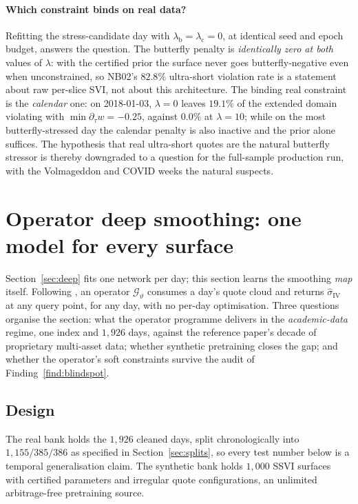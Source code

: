 \paragraph{Which constraint binds on real data?} Refitting the stress-candidate day with
$\lambda_{\mathrm b}=\lambda_{\mathrm c}=0$, at identical seed and epoch budget, answers the
question. The butterfly penalty is \emph{identically zero at both} values of $\lambda$: with the
certified prior the surface never goes butterfly-negative even when unconstrained, so NB02's
$82.8\%$ ultra-short violation rate is a statement about raw per-slice SVI, not about this
architecture. The binding
real constraint is the \emph{calendar} one: on 2018-01-03, $\lambda=0$ leaves $19.1\%$ of the
extended domain violating with $\min\partial_\tau w=-0.25$, against $0.0\%$ at $\lambda=10$;
while on the most butterfly-stressed day the calendar penalty is also inactive and the prior
alone suffices. The hypothesis that real ultra-short quotes are the natural butterfly stressor
is thereby downgraded to a question for the full-sample production run, with the Volmageddon and COVID
weeks the natural suspects.

\section{Operator deep smoothing: one model for every surface}\label{sec:operator}

Section~\ref{sec:deep} fits one network per day; this section learns the smoothing \emph{map}
itself. Following \cite{wiedemann2025}, an operator $\mathcal G_\vartheta$ consumes a day's
quote cloud and returns $\widehat\sigma_{\mathrm{IV}}$ at any query point, for any day, with no
per-day optimisation. Three questions organise the section: what the operator programme delivers
in the \emph{academic-data} regime, one index and $1{,}926$ days, against the reference paper's
decade of proprietary multi-asset data; whether synthetic pretraining closes the gap; and
whether the operator's soft constraints survive the audit of Finding~\ref{find:blindspot}.

\subsection{Design}

The real bank holds the $1{,}926$ cleaned days, split chronologically into $1{,}155/385/386$ as specified in Section~\ref{sec:splits}, so every test number below is a temporal generalisation claim. The
synthetic bank holds $1{,}000$ SSVI surfaces with certified parameters and irregular quote
configurations, an unlimited arbitrage-free pretraining source.

